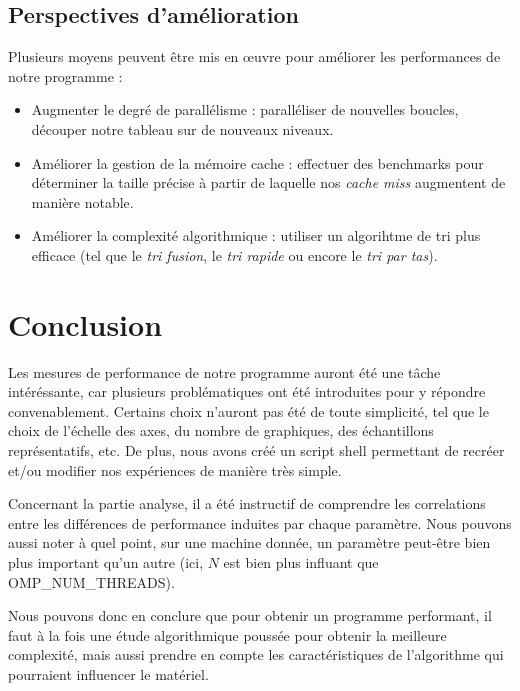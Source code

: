 \documentclass[12pt]{article}
\begin{document}
\subsection{Perspectives d'amélioration}
    
Plusieurs moyens peuvent être mis en \oe{}uvre pour améliorer les performances
de notre programme :
\begin{itemize}
    \item Augmenter le degré de parallélisme : paralléliser de nouvelles
        boucles, découper notre tableau sur de nouveaux niveaux.
    \item Améliorer la gestion de la mémoire cache : effectuer des
        benchmarks pour déterminer la taille précise à partir de laquelle
        nos \emph{cache miss} augmentent de manière notable.
    \item Améliorer la complexité algorithmique : utiliser un algorihtme de
        tri plus efficace (tel que le \emph{tri fusion}, le \emph{tri
        rapide} ou encore le \emph{tri par tas}).
\end{itemize}

\section{Conclusion}

Les mesures de performance de notre programme auront été une tâche intéréssante,
car plusieurs problématiques ont été introduites pour y répondre convenablement.
Certains choix n'auront pas été de toute simplicité, tel que le choix de l'échelle
des axes, du nombre de graphiques, des échantillons représentatifs, etc. De plus,
nous avons créé un script shell permettant de recréer et/ou modifier nos
expériences de manière très simple.

Concernant la partie analyse, il a été instructif de comprendre les correlations
entre les différences de performance induites par chaque paramètre. Nous pouvons
aussi noter à quel point, sur une machine donnée, un paramètre peut-être bien
plus important qu'un autre (ici, $N$ est bien plus influant que
OMP\_NUM\_THREADS).

Nous pouvons donc en conclure que pour obtenir un programme performant, il faut
à la fois une étude algorithmique poussée pour obtenir la meilleure complexité,
mais aussi prendre en compte les caractéristiques de l'algorithme qui pourraient
influencer le matériel.
\end{document}
